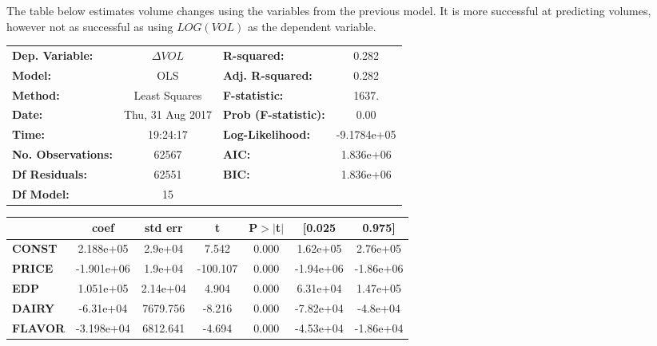 \documentclass{article}
\begin{document}
The table below estimates volume changes using the variables from the previous model. It is more successful at predicting volumes, however not as successful as using $LOG(VOL)$ as the dependent variable.

\begin{center}
\begin{tabular}{lclc}
\toprule
\textbf{Dep. Variable:}    &        $\Delta VOL$        & \textbf{  R-squared:         } &      0.282    \\
\textbf{Model:}            &       OLS        & \textbf{  Adj. R-squared:    } &      0.282    \\
\textbf{Method:}           &  Least Squares   & \textbf{  F-statistic:       } &      1637.    \\
\textbf{Date:}             & Thu, 31 Aug 2017 & \textbf{  Prob (F-statistic):} &      0.00     \\
\textbf{Time:}             &     19:24:17     & \textbf{  Log-Likelihood:    } & -9.1784e+05   \\
\textbf{No. Observations:} &       62567      & \textbf{  AIC:               } &  1.836e+06    \\
\textbf{Df Residuals:}     &       62551      & \textbf{  BIC:               } &  1.836e+06    \\
\textbf{Df Model:}         &          15      & \textbf{                     } &               \\
\bottomrule
\end{tabular}
\begin{tabular}{lcccccc}
               & \textbf{coef} & \textbf{std err} & \textbf{t} & \textbf{P$>$$|$t$|$} & \textbf{[0.025} & \textbf{0.975]}  \\
\midrule
\textbf{CONST} &    2.188e+05  &      2.9e+04     &     7.542  &         0.000        &     1.62e+05    &     2.76e+05     \\
\textbf{PRICE}    &   -1.901e+06  &      1.9e+04     &  -100.107  &         0.000        &    -1.94e+06    &    -1.86e+06     \\
\textbf{EDP}    &    1.051e+05  &     2.14e+04     &     4.904  &         0.000        &     6.31e+04    &     1.47e+05     \\
\textbf{DAIRY}    &    -6.31e+04  &     7679.756     &    -8.216  &         0.000        &    -7.82e+04    &     -4.8e+04     \\
\textbf{FLAVOR}    &   -3.198e+04  &     6812.641     &    -4.694  &         0.000        &    -4.53e+04    &    -1.86e+04     \\

\end{tabular}
\end{center}
\end{document}
